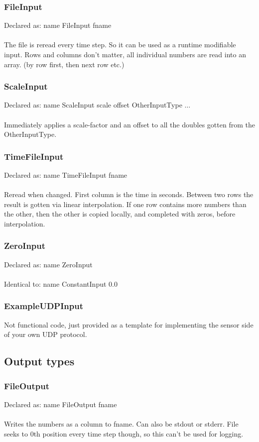 \documentclass[a4paper]{article}
\begin{document}
\subsubsection{FileInput}
Declared as: name FileInput fname\\\\
The file is reread every time step. So it can be used as a runtime modifiable input.
Rows and columns don't matter, all individual numbers are read into an array. (by row first, then next row etc.)
\subsubsection{ScaleInput}
Declared as: name ScaleInput scale offset OtherInputType $\ldots$\\\\
Immediately applies a scale-factor and an offset to all the doubles gotten from the OtherInputType.
\subsubsection{TimeFileInput}
Declared as: name TimeFileInput fname\\\\
Reread when changed. First column is the time in seconds. Between two rows the result is gotten via linear interpolation. If one row contains more numbers than the other, then the other is copied locally, and completed with zeros, before interpolation.
\subsubsection{ZeroInput}
Declared as: name ZeroInput\\\\
Identical to: name ConstantInput 0.0
\subsubsection{ExampleUDPInput}
Not functional code, just provided as a template for implementing the sensor side of your own UDP protocol.
\subsection{Output types}
\subsubsection{FileOutput}
Declared as: name FileOutput fname\\\\
Writes the numbers as a column to fname. Can also be stdout or stderr.
File seeks to 0th position every time step though, so this can't be used for logging.
\end{document}
